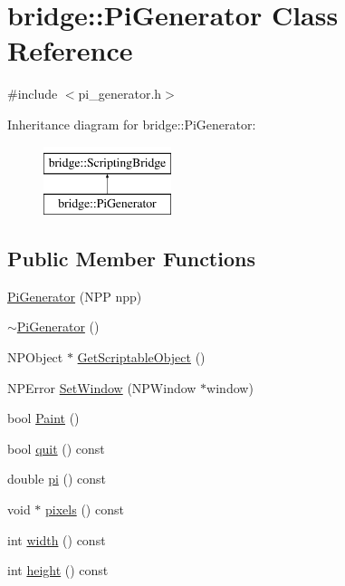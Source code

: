 \hypertarget{classbridge_1_1_pi_generator}{
\section{bridge::PiGenerator Class Reference}
\label{classbridge_1_1_pi_generator}
}


{\ttfamily \#include $<$pi\_\-generator.h$>$}

Inheritance diagram for bridge::PiGenerator:\begin{figure}[H]
\begin{center}
\leavevmode
\includegraphics[height=2cm]{classbridge_1_1_pi_generator}
\end{center}
\end{figure}
\subsection*{Public Member Functions}
\begin{DoxyCompactItemize}
\item 
\hyperlink{classbridge_1_1_pi_generator_a1f76a8c23b9f71c440d8a86e91f9b177}{PiGenerator} (NPP npp)
\item 
\hyperlink{classbridge_1_1_pi_generator_ae2369ad51a1680d21ff001404a8a84b5}{$\sim$PiGenerator} ()
\item 
NPObject $\ast$ \hyperlink{classbridge_1_1_pi_generator_a3581dcfb54c3d716ca1d931d457fd59f}{GetScriptableObject} ()
\item 
NPError \hyperlink{classbridge_1_1_pi_generator_ab0043ce08d314d9e1ffbd6f0a7b85d66}{SetWindow} (NPWindow $\ast$window)
\item 
bool \hyperlink{classbridge_1_1_pi_generator_a7d6deb8aca71aa7c3692894f489afd30}{Paint} ()
\item 
bool \hyperlink{classbridge_1_1_pi_generator_a756bd50f86283c0970abbb1ce0d0a322}{quit} () const 
\item 
double \hyperlink{classbridge_1_1_pi_generator_ac477983021d094e067edb005af305212}{pi} () const 
\item 
void $\ast$ \hyperlink{classbridge_1_1_pi_generator_a51490d5ee5ac9c1beb10459643f7083a}{pixels} () const 
\item 
int \hyperlink{classbridge_1_1_pi_generator_ab96bd1df955862228ca1c2a42344debc}{width} () const 
\item 
int \hyperlink{classbridge_1_1_pi_generator_a4f079f180ee84d53cab6df3f5baf7492}{height} () const 
\end{DoxyCompactItemize}

